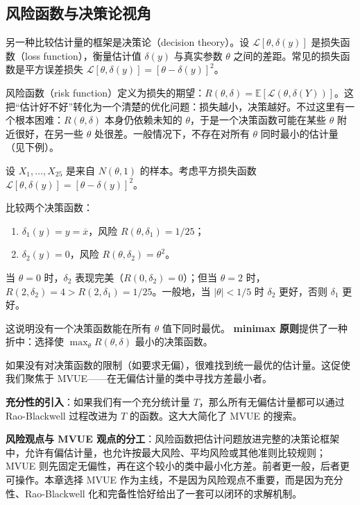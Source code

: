 \subsection{风险函数与决策论视角}

另一种比较估计量的框架是决策论（decision theory）。设 $\mathcal{L}[\theta, \delta(y)]$ 是损失函数（loss function），衡量估计值 $\delta(y)$ 与真实参数 $\theta$ 之间的差距。常见的损失函数是平方误差损失 $\mathcal{L}[\theta, \delta(y)] = [\theta - \delta(y)]^2$。

风险函数（risk function）定义为损失的期望：$R(\theta, \delta) = \mathbb{E}[\mathcal{L}(\theta, \delta(Y))]$。这把``估计好不好''转化为一个清楚的优化问题：损失越小，决策越好。不过这里有一个根本困难：$R(\theta, \delta)$ 本身仍依赖未知的 $\theta$，于是一个决策函数可能在某些 $\theta$ 附近很好，在另一些 $\theta$ 处很差。一般情况下，不存在对所有 $\theta$ 同时最小的估计量（见下例）。

\begin{example}[最小化风险函数的困难]\label{ex:risk-difficulty}
设 $X_1, \ldots, X_{25}$ 是来自 $N(\theta, 1)$ 的样本。考虑平方损失函数 $\mathcal{L}[\theta, \delta(y)] = [\theta - \delta(y)]^2$。

比较两个决策函数：
\begin{enumerate}
\item $\delta_1(y) = y = \overline{x}$，风险 $R(\theta, \delta_1) = 1/25$；
\item $\delta_2(y) = 0$，风险 $R(\theta, \delta_2) = \theta^2$。
\end{enumerate}

当 $\theta = 0$ 时，$\delta_2$ 表现完美（$R(0, \delta_2) = 0$）；但当 $\theta = 2$ 时，$R(2, \delta_2) = 4 > R(2, \delta_1) = 1/25$。一般地，当 $|\theta| < 1/5$ 时 $\delta_2$ 更好，否则 $\delta_1$ 更好。

这说明没有一个决策函数能在所有 $\theta$ 值下同时最优。\textbf{ minimax 原则}提供了一种折中：选择使 $\max_\theta R(\theta, \delta)$ 最小的决策函数。
\end{example}

如果没有对决策函数的限制（如要求无偏），很难找到统一最优的估计量。这促使我们聚焦于 MVUE——在无偏估计量的类中寻找方差最小者。

\textbf{充分性的引入}：如果我们有一个充分统计量 $T$，那么所有无偏估计量都可以通过 Rao-Blackwell 过程改进为 $T$ 的函数。这大大简化了 MVUE 的搜索。

\begin{remark}
\textbf{风险观点与 MVUE 观点的分工}：风险函数把估计问题放进完整的决策论框架中，允许有偏估计量，也允许按最大风险、平均风险或其他准则比较规则；MVUE 则先固定无偏性，再在这个较小的类中最小化方差。前者更一般，后者更可操作。本章选择 MVUE 作为主线，不是因为风险观点不重要，而是因为充分性、Rao-Blackwell 化和完备性恰好给出了一套可以闭环的求解机制。
\end{remark}


